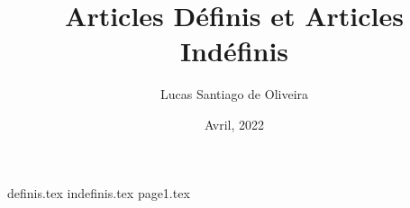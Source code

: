 \documentclass[12pt, twoside]{article}
\title{Articles Définis et Articles Indéfinis}
\author{Lucas Santiago de Oliveira}
\date{Avril, 2022}
\begin{document}
    \maketitle
    \vspace{2cm}
    \tableofcontents
    \newpage

    {definis.tex}
    {indefinis.tex}
    {page1.tex}
\end{document}
